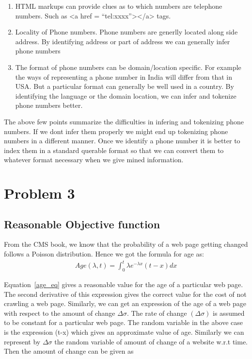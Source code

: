 \documentclass{article}
\begin{document}
\begin{enumerate}
  \item HTML markups can provide clues as to which numbers are telephone numbers.  Such as <a href = ``tel:xxxx''></a> tags.
  \item Locality of Phone numbers. Phone numbers are generlly located along side address.  By identifying address or part of address we can generally infer phone numbers
  \item  The format of phone numbers can be domain/location specific.  For example the ways of representing a phone number in India will differ from that in USA\@.  But a particular format can generally be well used in a country.  By identifying the language or the domain location, we can infer and tokenize phone numbers better.
\end{enumerate}

The above few points summarize the difficulties in infering and tokenizing phone numbers.  If we dont infer them properly we might end up tokenizing phone numbers in a different manner.  Once we identify a phone number it is better to index them in a standard querable format so that we can convert them to whatever format necessary when we give mined information.

\section[Problem 3]{Problem 3}
\subsection{Reasonable Objective function}
From the CMS book, we know that the probability of a web page getting changed follows a Poisson distribution.  Hence we got the formula for age as:
\begin{align}
  \label{age_eq}
  Age(\lambda, t) = \int_{0}^{t} \lambda e^{-\lambda x}(t - x)dx
\end{align}

Equation~\eqref{age_eq} gives a reasonable value for the age of a particular web page.  The second derivative of this expression gives the correct value for the cost of not crawling a web page.  Similarly, we can get an expression of the age of a web page with respect to the amount of change $\Delta \sigma$.  The rate of change $(\Delta \sigma)$ is assumed to be constant for a particular web page. The random variable in the above case is the expression (t-x) which gives an approximate value of age.  Similarly we can represent by $\Delta\sigma$ the random variable of amount of change of a website w.r.t time.  Then the amount of change can be given as 
\end{document}
